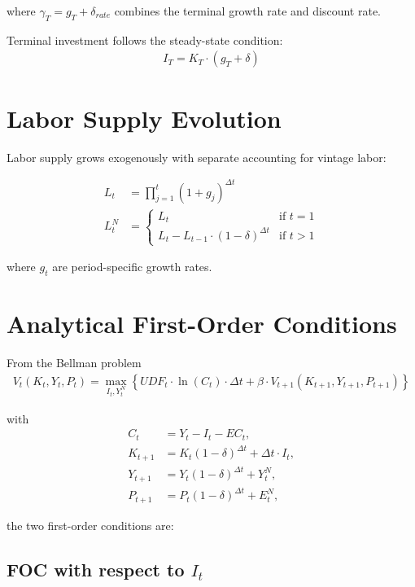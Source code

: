 \documentclass{article}
\begin{document}
where $\gamma_T = g_T + \delta_{rate}$ combines the terminal growth rate and discount rate.

Terminal investment follows the steady-state condition:
\begin{align}
I_T = K_T \cdot (g_T + \delta)
\end{align}

\section{Labor Supply Evolution}

Labor supply grows exogenously with separate accounting for vintage labor:

\begin{align}
L_t &= \prod_{j=1}^{t} (1 + g_{j})^{\Delta t} \\
L_t^N &= \begin{cases}
L_t & \text{if } t = 1 \\
L_t - L_{t-1} \cdot (1-\delta)^{\Delta t} & \text{if } t > 1
\end{cases}
\end{align}

where $g_t$ are period-specific growth rates.

\section{Analytical First-Order Conditions}

From the Bellman problem
\begin{align}
V_t(K_t, Y_t, P_t) = \max_{I_t, Y_t^N} \left\{ UDF_t \cdot \ln(C_t) \cdot \Delta t + \beta \cdot V_{t+1}(K_{t+1}, Y_{t+1}, P_{t+1}) \right\}
\end{align}

with
\begin{align}
C_t &= Y_t - I_t - EC_t, \\
K_{t+1} &= K_t(1-\delta)^{\Delta t} + \Delta t \cdot I_t, \\
Y_{t+1} &= Y_t(1-\delta)^{\Delta t} + Y_t^N, \\
P_{t+1} &= P_t(1-\delta)^{\Delta t} + E_t^N,
\end{align}

the two first-order conditions are:

\subsection{FOC with respect to $I_t$}
\end{document}
